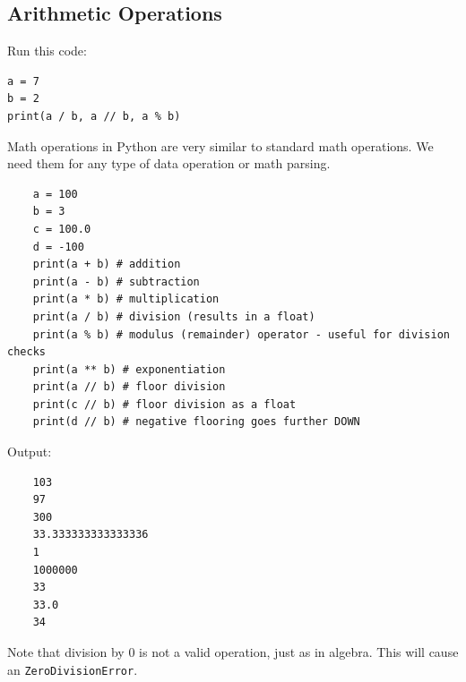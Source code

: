 \subsection{Arithmetic Operations}
\begin{Worked}[Division]
\begin{Problem}
Run this code:
\begin{verbatim}
a = 7
b = 2
print(a / b, a // b, a % b)
\end{verbatim}
\end{Problem}
\end{Worked}

Math operations in Python are very similar to standard math operations. We need them for any type of data operation or math parsing.


\begin{verbatim}
    a = 100
    b = 3
    c = 100.0
    d = -100
    print(a + b) # addition
    print(a - b) # subtraction
    print(a * b) # multiplication
    print(a / b) # division (results in a float)
    print(a % b) # modulus (remainder) operator - useful for division checks
    print(a ** b) # exponentiation
    print(a // b) # floor division
    print(c // b) # floor division as a float
    print(d // b) # negative flooring goes further DOWN
\end{verbatim}

Output:
\begin{verbatim}
    103
    97
    300
    33.333333333333336
    1
    1000000
    33
    33.0
    34
\end{verbatim}

Note that division by $0$ is not a valid operation, just as in algebra. This will cause an \texttt{ZeroDivisionError}.
